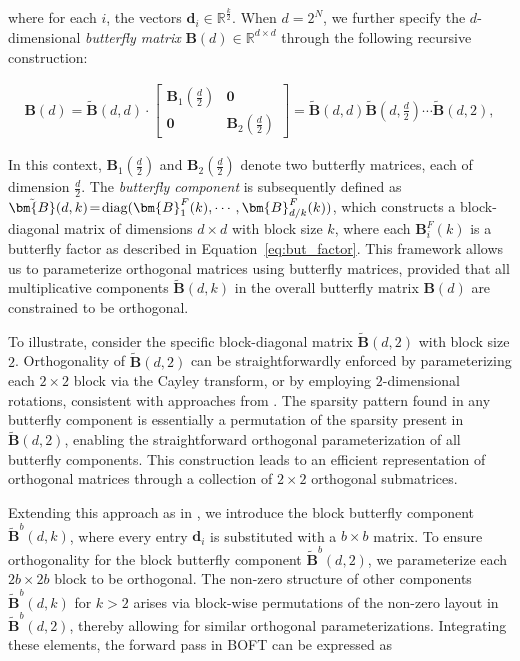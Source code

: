 where for each $i$, the vectors $\bm{d}_i\in\mathbb{R}^{\frac{k}{2}}$. When $d=2^N$, we further specify the $d$-dimensional \emph{butterfly matrix} $\bm{B}(d)\in\mathbb{R}^{d\times d}$ through the following recursive construction:

\begin{equation}
\begin{aligned}
    \!\!\bm{B}(d)=\tilde{\bm{B}}(d,d)\!\cdot\!\begin{bmatrix}
    \bm{B}_1(\frac{d}{2})\!\!\!\!\! & \bm{0} \\
    \bm{0}\!\!\!\!\! &\bm{B}_2(\frac{d}{2})
    \end{bmatrix}= \tilde{\bm{B}}(d,d)\tilde{\bm{B}}(d,\frac{d}{2})\cdots\tilde{\bm{B}}(d,2),
\end{aligned}
\end{equation}

In this context, $\bm{B}_1(\frac{d}{2})$ and $\bm{B}_2(\frac{d}{2})$ denote two butterfly matrices, each of dimension $\frac{d}{2}$. The \emph{butterfly component} is subsequently defined as $\thickmuskip=2mu \medmuskip=2mu \tilde{\bm{B}}(d,k)=\text{diag}(\bm{B}^F_1(k),\cdots,\bm{B}^F_{d/k}(k))$, which constructs a block-diagonal matrix of dimensions $d\times d$ with block size $k$, where each $\bm{B}^F_i(k)$ is a butterfly factor as described in Equation~\ref{eq:but_factor}. This framework allows us to parameterize orthogonal matrices using butterfly matrices, provided that all multiplicative components $\tilde{\bm{B}}(d,k)$ in the overall butterfly matrix $\bm{B}(d)$ are constrained to be orthogonal. 

To illustrate, consider the specific block-diagonal matrix $\tilde{\bm{B}}(d,2)$ with block size $2$. Orthogonality of $\tilde{\bm{B}}(d,2)$ can be straightforwardly enforced by parameterizing each $2\times 2$ block via the Cayley transform, or by employing $2$-dimensional rotations, consistent with approaches from \cite{liu2021orthogonal,qiu2023controlling}. The sparsity pattern found in any butterfly component is essentially a permutation of the sparsity present in $\tilde{\bm{B}}(d,2)$, enabling the straightforward orthogonal parameterization of all butterfly components. This construction leads to an efficient representation of orthogonal matrices through a collection of $2\times 2$ orthogonal submatrices.

Extending this approach as in \cite{chen2022pixelated}, we introduce the block butterfly component $\tilde{\bm{B}}^b(d,k)$, where every entry $\bm{d}_i$ is substituted with a $b\times b$ matrix. To ensure orthogonality for the block butterfly component $\tilde{\bm{B}}^b(d,2)$, we parameterize each $2b\times 2b$ block to be orthogonal. The non-zero structure of other components $\tilde{\bm{B}}^b(d,k)$ for $k > 2$ arises via block-wise permutations of the non-zero layout in $\tilde{\bm{B}}^b(d,2)$, thereby allowing for similar orthogonal parameterizations. Integrating these elements, the forward pass in BOFT can be expressed as

